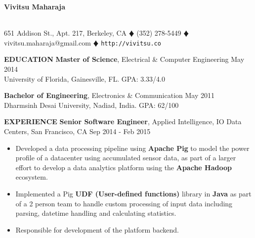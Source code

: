 \documentclass[10pt, letterpaper]{article}
\begin{document}
\begin{center}
\textbf{\Large Vivitsu Maharaja}
\date{}
\thispagestyle{empty}
\smallskip \\
651 Addison St., Apt. 217, Berkeley, CA $\vardiamond$ (352) 278-5449 $\vardiamond$ vivitsu.maharaja@gmail.com $\vardiamond$ \texttt{http://vivitsu.co}
\end{center}

\textbf{EDUCATION}
\smallskip
\newline
{\bf Master of Science}, Electrical \& Computer Engineering \hfill May 2014\\
University of Florida, Gainesville, FL. \hfill GPA: 3.33/4.0

{\bf Bachelor of Engineering}, Electronics \& Communication \hfill May 2011\\
Dharmsinh Desai University, Nadiad, India. \hfill GPA: 62/100

\textbf{EXPERIENCE}
\smallskip
\newline
\textbf{Senior Software Engineer}, Applied Intelligence, IO Data Centers, San Francisco, CA \hfill Sep 2014 - Feb 2015
\begin{itemize}
    \item Developed a data processing pipeline using \textbf{Apache Pig} to model 
the power profile of a datacenter using accumulated sensor data, as part of a larger effort to develop a data analytics
platform using the \textbf{Apache Hadoop} ecosystem.
    \item Implemented a Pig \textbf{UDF (User-defined functions)} library in \textbf{Java} as part of a 2 person team
to handle custom processing of input data including parsing, datetime handling and
calculating statistics.
    \item Responsible for development of the platform backend.
\end{itemize}
\end{document}
